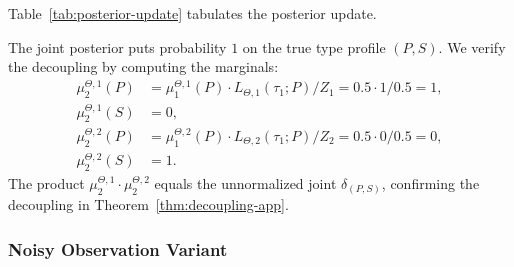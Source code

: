 Table~\ref{tab:posterior-update} tabulates the posterior update.

\begin{table}[ht]
\caption{Posterior update after episode 1. Joint posterior is computed by Bayes' rule, then verified against the product of marginals.}
\label{tab:posterior-update}
\begin{center}
\end{center}
\end{table}

The joint posterior puts probability $1$ on the true type profile $(P, S)$. We verify the decoupling by computing the marginals:
{\small\begin{align}
\mu_2^{\Theta,1}(P) &= \mu_1^{\Theta,1}(P) \cdot L_{\Theta,1}(\tau_1; P) / Z_1 = 0.5 \cdot 1 / 0.5 = 1, \\
\mu_2^{\Theta,1}(S) &= 0, \\
\mu_2^{\Theta,2}(P) &= \mu_1^{\Theta,2}(P) \cdot L_{\Theta,2}(\tau_1; P) / Z_2 = 0.5 \cdot 0 / 0.5 = 0, \\
\mu_2^{\Theta,2}(S) &= 1.
\end{align}}
The product $\mu_2^{\Theta,1} \cdot \mu_2^{\Theta,2}$ equals the unnormalized joint $\delta_{(P,S)}$, confirming the decoupling in Theorem~\ref{thm:decoupling-app}.

\subsubsection{Noisy Observation Variant}


